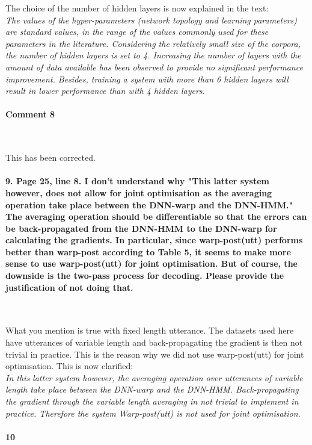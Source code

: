 \documentclass[]{article}
\begin{document}
The choice of the number of hidden layers is now explained in the text:\\
\textit{The values of the hyper-parameters (network topology and learning parameters) are standard values, in the range of the values commonly used for these parameters in the literature. Considering the relatively small size of the corpora, the number of hidden layers is set to 4. Increasing the number of layers with the amount of data available has been observed to provide no significant performance improvement. Besides, training a system with more than 6 hidden layers will result in lower performance than with 4 hidden layers.}
\paragraph{Comment 8}

~

This has been corrected.

\paragraph{9. Page 25, line 8. I don't understand why "This latter system however, does not allow for joint optimisation as the averaging operation take place between the DNN-warp and the DNN-HMM." The averaging operation should be differentiable so that the errors can be back-propagated from the DNN-HMM to the DNN-warp for calculating the gradients. In particular, since warp-post(utt) performs better than warp-post according to Table 5, it seems to make more sense to use warp-post(utt) for joint optimisation. But of course, the downside is the two-pass process for decoding. Please provide the justification of not doing that.}

~

What you mention is true with fixed length utterance. The datasets used here have utterances of variable length and back-propagating the gradient is then not trivial in practice. This is the reason why we did not use warp-post(utt) for joint optimisation. This is now clarified:\\
\textit{In this latter system however, the averaging operation over utterances of variable length take place between the DNN-warp and the DNN-HMM. Back-propagating the gradient through the variable length averaging in not trivial to implement in practice. Therefore the system \textit{Warp-post(utt)} is not used for joint optimisation.}

\paragraph{10}
\end{document}
